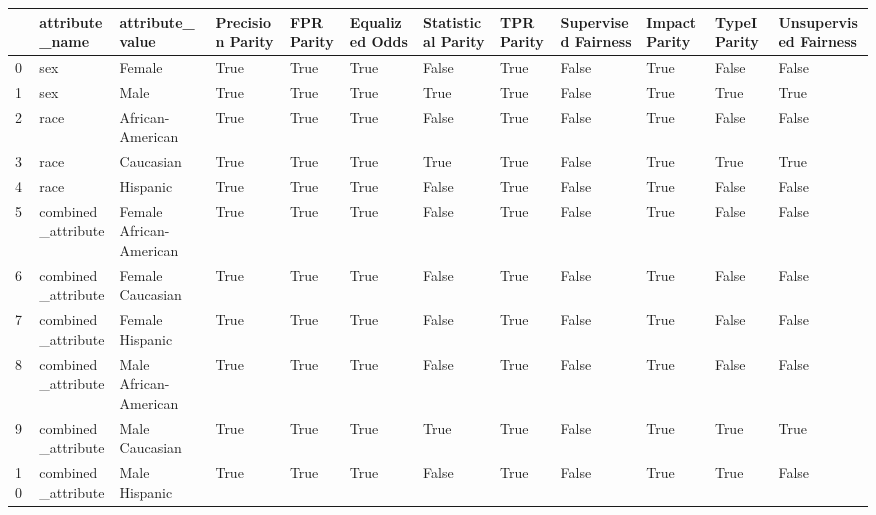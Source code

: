 \begin{tabular}{llllllllllll}
\toprule
{} &      attribute\_name &          attribute\_value &  Precision Parity &  FPR Parity &  Equalized Odds &  Statistical Parity &  TPR Parity &  Supervised Fairness &  Impact Parity &  TypeI Parity &  Unsupervised Fairness \\
\midrule
0  &                 sex &                   Female &              True &        True &            True &               False &        True &                False &           True &         False &                  False \\
1  &                 sex &                     Male &              True &        True &            True &                True &        True &                False &           True &          True &                   True \\
2  &                race &         African-American &              True &        True &            True &               False &        True &                False &           True &         False &                  False \\
3  &                race &                Caucasian &              True &        True &            True &                True &        True &                False &           True &          True &                   True \\
4  &                race &                 Hispanic &              True &        True &            True &               False &        True &                False &           True &         False &                  False \\
5  &  combined\_attribute &  Female African-American &              True &        True &            True &               False &        True &                False &           True &         False &                  False \\
6  &  combined\_attribute &         Female Caucasian &              True &        True &            True &               False &        True &                False &           True &         False &                  False \\
7  &  combined\_attribute &          Female Hispanic &              True &        True &            True &               False &        True &                False &           True &         False &                  False \\
8  &  combined\_attribute &    Male African-American &              True &        True &            True &               False &        True &                False &           True &         False &                  False \\
9  &  combined\_attribute &           Male Caucasian &              True &        True &            True &                True &        True &                False &           True &          True &                   True \\
10 &  combined\_attribute &            Male Hispanic &              True &        True &            True &               False &        True &                False &           True &          True &                  False \\
\bottomrule
\end{tabular}

